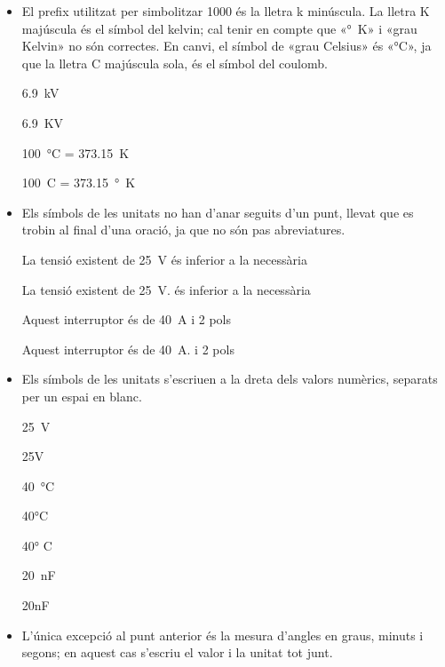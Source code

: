 \begin{itemize}

\item El prefix utilitzat per simbolitzar 1000 és la lletra k minúscula.  La lletra K majúscula és el símbol del  kelvin; cal tenir en compte que «\unit{\degree K}»  i «grau Kelvin» no són correctes. En canvi, el símbol de «grau Celsius» és «\unit{\degreeCelsius}», ja que la lletra C majúscula sola, és el símbol del coulomb.

\textcolor{Green}\faCheckSquare{} \qty{6,9}{kV}

\textcolor{Red}\faTimesCircle{} \qty{6,9}{KV}

\textcolor{Green}\faCheckSquare{} \qty{100}{\degreeCelsius} = \qty{373,15}{K}

\textcolor{Red}\faTimesCircle{} \qty{100}{C} = \qty{373,15}{\degree K}


\item Els símbols de les unitats no han d'anar seguits d'un punt, llevat que es trobin al final d'una oració, ja que no són pas
abreviatures.

\textcolor{Green}\faCheckSquare{} La tensió existent de \qty{25}{V} és inferior a la necessària

\textcolor{Red}\faTimesCircle{} La tensió existent de \qty{25}{V}. és inferior a la necessària

\textcolor{Green}\faCheckSquare{}  Aquest interruptor és de \qty{40}{A} i 2 pols

\textcolor{Red}\faTimesCircle{}  Aquest interruptor és de \qty{40}{A}. i 2 pols


\item Els símbols de les unitats s'escriuen a la dreta dels valors
numèrics, separats per un espai en blanc.

\textcolor{Green}\faCheckSquare{} \qty{25}{V}

\textcolor{Red}\faTimesCircle{} 25V

\textcolor{Green}\faCheckSquare{} \qty{40}{\degreeCelsius}

\textcolor{Red}\faTimesCircle{} 40\unit{\degreeCelsius}

\textcolor{Red}\faTimesCircle{} 40\unit{\degree} C

\textcolor{Green}\faCheckSquare{} \qty{20}{nF}

\textcolor{Red}\faTimesCircle{} 20nF


\item  L'única excepció al punt anterior és la mesura d'angles en graus, minuts i segons; en aquest cas s'escriu el valor i la unitat tot junt.


\end{itemize}
